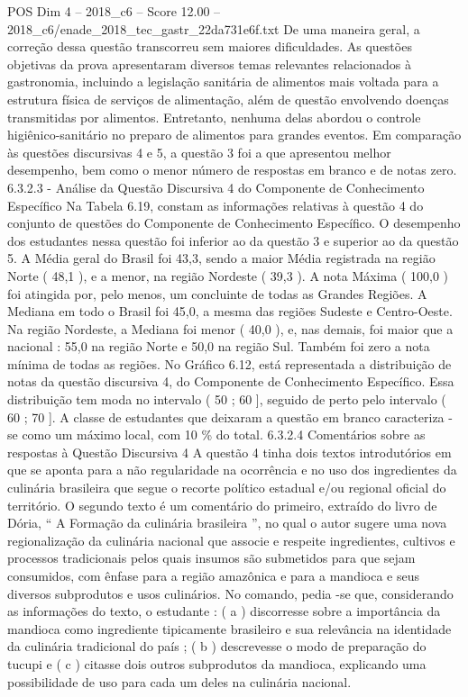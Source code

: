 \begin{textsample}{POS Dim 4 – 2018\_c6 – Score 12.00 – 2018\_c6/enade\_2018\_tec\_gastr\_22da731e6f.txt}
De uma maneira geral, a correção dessa questão transcorreu sem maiores dificuldades.
As questões objetivas da prova apresentaram diversos temas relevantes relacionados à gastronomia, incluindo a legislação sanitária de alimentos mais voltada para a estrutura física de serviços de alimentação, além de questão envolvendo doenças transmitidas por alimentos.
Entretanto, nenhuma delas abordou o controle higiênico-sanitário no preparo de alimentos para grandes eventos.
Em comparação às questões discursivas 4 e 5, a questão 3 foi a que apresentou melhor desempenho, bem como o menor número de respostas em branco e de notas zero. 6.3.2.3 - Análise da Questão Discursiva 4 do Componente de Conhecimento Específico Na Tabela 6.19, constam as informações relativas à questão 4 do conjunto de questões do Componente de Conhecimento Específico.
O desempenho dos estudantes nessa questão foi inferior ao da questão 3 e superior ao da questão 5.
A Média geral do Brasil foi 43,3, sendo a maior Média registrada na região Norte ( 48,1 ), e a menor, na região Nordeste ( 39,3 ).
A nota Máxima ( 100,0 ) foi atingida por, pelo menos, um concluinte de todas as Grandes Regiões.
A Mediana em todo o Brasil foi 45,0, a mesma das regiões Sudeste e Centro-Oeste.
Na região Nordeste, a Mediana foi menor ( 40,0 ), e, nas demais, foi maior que a nacional : 55,0 na região Norte e 50,0 na região Sul.
Também foi zero a nota mínima de todas as regiões.
No Gráfico 6.12, está representada a distribuição de notas da questão discursiva 4, do Componente de Conhecimento Específico.
Essa distribuição tem moda no intervalo ( 50 ; 60 ], seguido de perto pelo intervalo ( 60 ; 70 ].
A classe de estudantes que deixaram a questão em branco caracteriza -se como um máximo local, com 10 \% do total. 6.3.2.4 Comentários sobre as respostas à Questão Discursiva 4 A questão 4 tinha dois textos introdutórios em que se aponta para a não regularidade na ocorrência e no uso dos ingredientes da culinária brasileira que segue o recorte político estadual e/ou regional oficial do território.
O segundo texto é um comentário do primeiro, extraído do livro de Dória, “ A Formação da culinária brasileira ”, no qual o autor sugere uma nova regionalização da culinária nacional que associe e respeite ingredientes, cultivos e processos tradicionais pelos quais insumos são submetidos para que sejam consumidos, com ênfase para a região amazônica e para a mandioca e seus diversos subprodutos e usos culinários.
No comando, pedia -se que, considerando as informações do texto, o estudante : ( a ) discorresse sobre a importância da mandioca como ingrediente tipicamente brasileiro e sua relevância na identidade da culinária tradicional do país ; ( b ) descrevesse o modo de preparação do tucupi e ( c ) citasse dois outros subprodutos da mandioca, explicando uma possibilidade de uso para cada um deles na culinária nacional.

\end{textsample}
